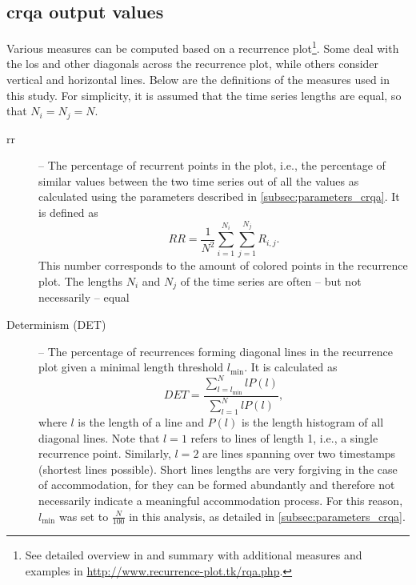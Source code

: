 \subsection{\Acs{crqa} output values}
\label{subsec:output_values}

Various measures can be computed based on a recurrence plot\footnote{See detailed overview in \citet{Marwan2007recurrence} and summary with additional measures and examples in \url{http://www.recurrence-plot.tk/rqa.php}.}.
Some deal with the \ac{los} and other diagonals across the recurrence plot, while others consider vertical and horizontal lines.
Below are the definitions of the measures used in this study.
For simplicity, it is assumed that the time series lengths are equal, so that $N_i=N_j=N$.

\begin{description}
	\item[\Acf{rr}] -- The percentage of recurrent points in the plot, i.e., the percentage of similar values between the two time series out of all the values as calculated using the parameters described in \cref{subsec:parameters_crqa}.
	It is defined as
	\begin{equation}
		\label{eq:rr}
		RR = \frac{1}{N^2} \sum_{i=1}^{N_i} \sum_{j=1}^{N_j} R_{i,j}.
	\end{equation}
	This number corresponds to the amount of colored points in the recurrence plot.
	The lengths $N_i$ and $N_j$ of the time series are often -- but not necessarily -- equal
	
	\item[Determinism (DET)] -- The percentage of recurrences forming diagonal lines in the recurrence plot given a minimal length threshold $l_{\min}$.
	It is calculated as
	\begin{equation}
		\label{eq:det}
		DET = \frac{\sum_{l=l_{\min}}^{N} l P(l)}{\sum_{l=1}^N l P(l)},
	\end{equation}
	where $l$ is the length of a line and $P(l)$ is the length histogram of all diagonal lines.
	Note that $l=1$ refers to lines of length 1, i.e., a single recurrence point.	
	Similarly, $l=2$ are lines spanning over two timestamps (shortest lines possible).
	Short lines lengths are very forgiving in the case of accommodation, for they can be formed abundantly and therefore not necessarily indicate a meaningful accommodation process.
	For this reason, $l_{\min}$ was set to $\frac{N}{100}$ in this analysis, as detailed in \cref{subsec:parameters_crqa}.
	

\end{description}

